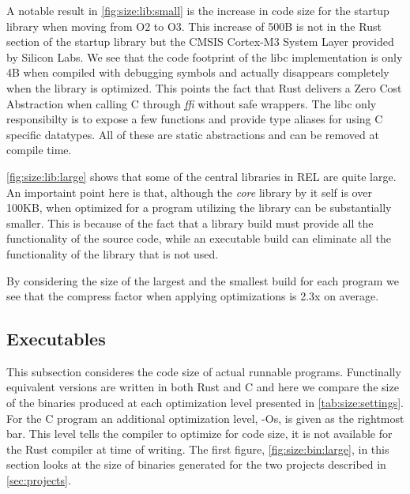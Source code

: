 A notable result in \autoref{fig:size:lib:small} is the increase in code size for the startup library when moving from O2 to O3.
This increase of 500B is not in the Rust section of the startup library but the CMSIS Cortex-M3 System Layer provided by Silicon Labs.
We see that the code footprint of the libc implementation is only 4B when compiled with debugging symbols and actually disappears completely when the library is optimized.
This points the fact that Rust delivers a Zero Cost Abstraction when calling C through \emph{ffi} without safe wrappers.
The libc only responsibilty is to expose a few functions and provide type aliases for using C specific datatypes.
All of these are static abstractions and can be removed at compile time.

\autoref{fig:size:lib:large} shows that some of the central libraries in REL are quite large.
An importaint point here is that, although the \emph{core} library by it self is over 100KB, when optimized for a program utilizing the library can be substantially smaller.
This is because of the fact that a library build must provide all the functionality of the source code, while an executable build can eliminate all the functionality of the library that is not used.

By considering the size of the largest and the smallest build for each program we see that the compress factor when applying optimizations is 2.3x on average.

\subsection{Executables}

This subsection consideres the code size of actual runnable programs.
Functinally equivalent versions are written in both Rust and C and here we compare the size of the binaries produced at each optimization level presented in \autoref{tab:size:settings}.
For the C program an additional optimization level, -Os, is given as the rightmost bar.
This level tells the compiler to optimize for code size, it is not available for the Rust compiler at time of writing.
The first figure, \autoref{fig:size:bin:large}, in this section looks at the size of binaries generated for the two projects described in \autoref{sec:projects}.

